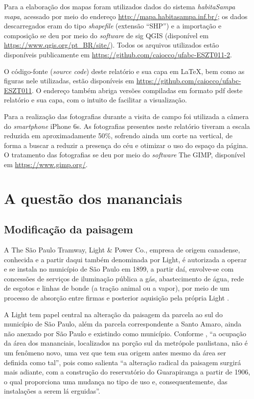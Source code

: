 	Para a elaboração dos mapas foram utilizados dados do sistema \textit{habitaSampa mapa}, acessado por meio do endereço \url{http://mapa.habitasampa.inf.br/}; os dados descarregados eram do tipo \textit{shapefile} (extensão ``SHP'') e a importação e composição se deu por meio do \textit{software} de \gls{sig} QGIS (disponível em \url{https://www.qgis.org/pt_BR/site/}). Todos os arquivos utilizados estão disponíveis publicamente em \url{https://github.com/caiocco/ufabc-ESZT011-2}.

	O código-fonte (\textit{source code}) deste relatório e sua capa em \LaTeX, bem como as figuras nele utilizadas, estão disponíveis em \url{https://github.com/caiocco/ufabc-ESZT011}. O endereço também abriga versões compiladas em formato \gls{pdf} deste relatório e sua capa, com o intuito de facilitar a visualização.
	
	Para a realização das fotografias durante a visita de campo foi utilizada a câmera do \textit{smartphone} iPhone 6s. As fotografias presentes neste relatório tiveram a escala reduzida em aproximadamente 50\%, sofrendo ainda um corte na vertical, de forma a buscar a reduzir a presença do céu e otimizar o uso do espaço da página. O tratamento das fotografias se deu por meio do \textit{software} The GIMP, disponível em \url{https://www.gimp.org/}.
	
	\chapter{A questão dos mananciais}
	
	\section{Modificação da paisagem} \label{light}
	
	A The São Paulo Tramway, Light \& Power Co., empresa de origem canadense, conhecida e a partir daqui também denominada por Light, é autorizada a operar e se instala no município de São Paulo em 1899, a partir daí, envolve-se com concessões de serviços de iluminação pública a gás, abastecimento de água, rede de esgotos e linhas de bonde (a tração animal ou a vapor), por meio de um processo de absorção entre firmas e posterior aquisição pela própria Light \cite[p.42]{Francca2000}.
	
	A Light tem papel central na alteração da paisagem da parcela ao sul do município de São Paulo, além da parcela correspondente a Santo Amaro, ainda não anexado por São Paulo e existindo como município. Conforme , ``a ocupação da área dos mananciais, localizados na porção sul da metrópole paulistana, não é um fenômeno novo, uma vez que tem sua origem antes mesmo da área ser definida como tal'', pois como salienta  ``a alteração radical da paisagem surgirá mais adiante, com a construção do reservatório do Guarapiranga a partir de 1906, o qual proporciona uma mudança no tipo de uso e, consequentemente, das instalações a serem lá erguidas''.
	
